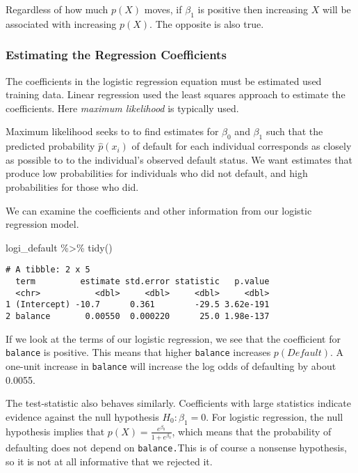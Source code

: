 \documentclass[
]{article}
\newenvironment{Shaded}{\begin{snugshade}}{\end{snugshade}}
\newcommand{\FunctionTok}[1]{\textcolor[rgb]{0.00,0.00,0.00}{#1}}
\newcommand{\NormalTok}[1]{#1}
\newcommand{\SpecialCharTok}[1]{\textcolor[rgb]{0.00,0.00,0.00}{#1}}
\begin{document}
Regardless of how much \(p(X)\) moves, if \(\beta_1\) is positive then
increasing \(X\) will be associated with increasing \(p(X)\). The
opposite is also true.

\hypertarget{estimating-the-regression-coefficients}{%
\subsubsection{Estimating the Regression
Coefficients}\label{estimating-the-regression-coefficients}}

The coefficients in the logistic regression equation must be estimated
used training data. Linear regression used the least squares approach to
estimate the coefficients. Here \emph{maximum likelihood} is typically
used.

Maximum likelihood seeks to to find estimates for \(\beta_0\) and
\(\beta_1\) such that the predicted probability \(\hat{p}(x_i)\) of
default for each individual corresponds as closely as possible to to the
individual's observed default status. We want estimates that produce low
probabilities for individuals who did not default, and high
probabilities for those who did.

We can examine the coefficients and other information from our logistic
regression model.

\begin{Shaded}
\begin{Highlighting}[]
\NormalTok{logi\_default }\SpecialCharTok{\%\textgreater{}\%} \FunctionTok{tidy}\NormalTok{()}
\end{Highlighting}
\end{Shaded}

\begin{verbatim}
# A tibble: 2 x 5
  term         estimate std.error statistic   p.value
  <chr>           <dbl>     <dbl>     <dbl>     <dbl>
1 (Intercept) -10.7      0.361        -29.5 3.62e-191
2 balance       0.00550  0.000220      25.0 1.98e-137
\end{verbatim}

If we look at the terms of our logistic regression, we see that the
coefficient for \texttt{balance} is positive. This means that higher
\texttt{balance} increases \(p(Default)\). A one-unit increase in
\texttt{balance} will increase the log odds of defaulting by about
0.0055.

The test-statistic also behaves similarly. Coefficients with large
statistics indicate evidence against the null hypothesis
\(H_0: \beta_1 = 0\). For logistic regression, the null hypothesis
implies that \(p(X) = \frac{e^{\beta_0}}{1+e^{\beta_0}}\), which means
that the probability of defaulting does not depend on
\texttt{balance.}This is of course a nonsense hypothesis, so it is not
at all informative that we rejected it.
\end{document}
